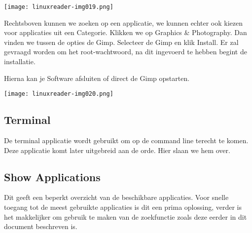\begin{center}
\texttt{[image: linuxreader-img019.png]}
\end{center}
{
Rechtsboven kunnen we zoeken op een applicatie, we kunnen echter ook kiezen voor applicaties uit een Categorie. Klikken
we op Graphics \& Photography. Dan vinden we tussen de opties de Gimp. Selecteer de Gimp en klik Install. Er zal
gevraagd worden om het root-wachtwoord, na dit ingevoerd te hebben begint de installatie.}

{
Hierna kan je Software afsluiten of direct de Gimp opstarten.}

\begin{center}
\texttt{[image: linuxreader-img020.png]}
\end{center}
\subsection{Terminal}
\hypertarget{RefHeadingToc6814303847364}{}{
De terminal applicatie wordt gebruikt om op de command line terecht te komen. Deze applicatie komt later uitgebreid aan
de orde. Hier slaan we hem over.}

\subsection{Show Applications}
\hypertarget{RefHeadingToc6816303847364}{}{
Dit geeft een beperkt overzicht van de beschikbare applicaties. Voor snelle toegang tot de meest gebruikte applicaties
is dit een prima oplossing, verder is het makkelijker om gebruik te maken van de zoekfunctie zoals deze eerder in dit
document beschreven is.}

